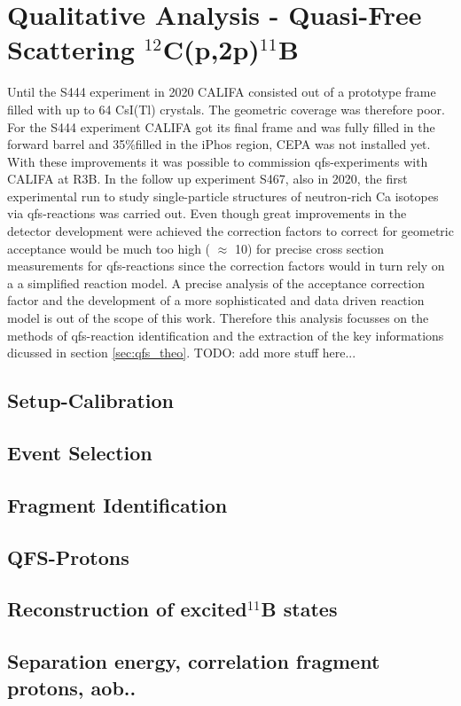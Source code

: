 \section{Qualitative Analysis - Quasi-Free Scattering $^{12}$C(p,2p)$^{11}$B}
Until the S444 experiment in 2020 CALIFA consisted out of a prototype frame filled with up to 64 CsI(Tl) crystals. The geometric coverage was therefore poor. For the S444 experiment CALIFA got its final frame and was fully filled in the forward barrel and 35\%filled in the iPhos region, CEPA was not installed yet. With these improvements it was possible to commission qfs-experiments with CALIFA at R3B. In the follow up experiment S467, also in 2020, the first experimental run to study single-particle structures of neutron-rich Ca isotopes via qfs-reactions was carried out.\newline
Even though great improvements in the detector development  were achieved the correction factors to correct for geometric acceptance would be much too high ( $\approx$ 10) for precise cross section measurements for qfs-reactions since the correction factors would in turn rely on a a simplified reaction model. A precise analysis of the acceptance correction factor and the development of a more sophisticated and data driven reaction model is out of the scope of this work. Therefore this analysis focusses on the methods of qfs-reaction identification and the extraction of the key informations dicussed in section \ref{sec:qfs_theo}. TODO: add more stuff here...\newline
\subsection{Setup-Calibration}

\subsection{Event Selection}

\subsection{Fragment Identification}

\subsection{QFS-Protons}

\subsection{Reconstruction of excited$ ^{11}$B states}

\subsection{Separation energy, correlation fragment protons, aob..}
